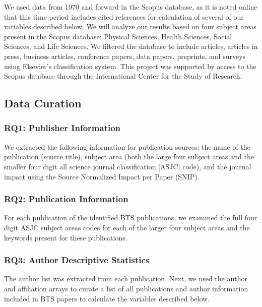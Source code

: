\documentclass[
  man,floatsintext]{apa6}
\begin{document}
We used
data from 1970 and forward in the Scopus database, as it is noted online
that this time period includes cited references for calculation of
several of our variables described below. We will analyze our results
based on four subject areas present in the Scopus database: Physical
Sciences, Health Sciences, Social Sciences, and Life Sciences. We
filtered the database to include articles, articles in press, business
articles, conference papers, data papers, preprints, and surveys using
Elsevier's classification system. This project was supported by access
to the Scopus database through the International Center for the Study of
Research.

\hypertarget{data-curation}{%
\subsection{Data Curation}\label{data-curation}}

\hypertarget{rq1-publisher-information}{%
\subsubsection{RQ1: Publisher Information}\label{rq1-publisher-information}}

We extracted the following information for publication sources: the name
of the publication (source title), subject area (both the large four
subject areas and the smaller four digit all science journal
classification {[}ASJC{]} code), and the journal impact using the Source
Normalized Impact per Paper (SNIP).

\hypertarget{rq2-publication-information}{%
\subsubsection{RQ2: Publication Information}\label{rq2-publication-information}}

For each publication of the identified BTS publications, we examined the
full four digit ASJC subject areas codes for each of the larger four
subject areas and the keywords present for these publications.

\hypertarget{rq3-author-descriptive-statistics}{%
\subsubsection{RQ3: Author Descriptive Statistics}\label{rq3-author-descriptive-statistics}}

The author list was extracted from each publication. Next, we used the
author and affiliation arrays to curate a list of all publications and
author information included in BTS papers to calculate the variables
described below.
\end{document}
